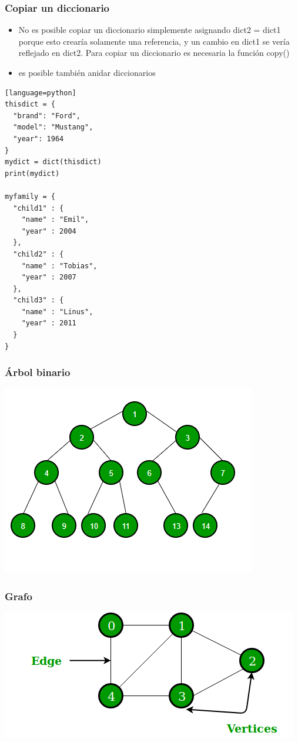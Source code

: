 \documentclass[hyperref={pdfpagelabels=false},xcolor=pst,pdf,fragile]{beamer}
\begin{document}
\begin{frame}[fragile]
\frametitle{Copiar un diccionario}
    \begin{itemize}
    \item No es posible copiar un diccionario simplemente asignando dict2 = dict1 porque esto crearía solamente una referencia, y un cambio en dict1 se vería reflejado en dict2. Para copiar un diccionario es necesaria la función copy()
    \item es posible también anidar diccionarios
    \end{itemize}
        \begin{lstlisting}[basicstyle=\tiny][language=python]
thisdict = {
  "brand": "Ford",
  "model": "Mustang",
  "year": 1964
}
mydict = dict(thisdict)
print(mydict)

myfamily = {
  "child1" : {
    "name" : "Emil",
    "year" : 2004
  },
  "child2" : {
    "name" : "Tobias",
    "year" : 2007
  },
  "child3" : {
    "name" : "Linus",
    "year" : 2011
  }
}
    \end{lstlisting}
\end{frame}

\begin{frame}
\frametitle{Árbol binario}
  \begin{center}
	  \includegraphics[scale=0.4]{img/binary_tree.png}
  \end{center}
\end{frame}

\begin{frame}
\frametitle{Grafo}
  \begin{center}
	  \includegraphics[scale=0.4]{img/graph.png}
  \end{center}
\end{frame}
\end{document}
